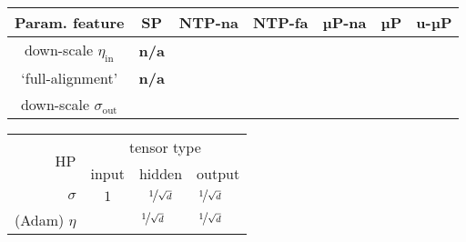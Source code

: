 \documentclass{article}
\newcommand{\tick}{\ding{51}}
\newcommand{\cross}{\ding{55}}
\begin{document}
\vspace{1em}
\noindent
\begin{minipage}[t]{0.45\textwidth}
    \centering
    \begin{tabular}{ccccccc}
        \toprule
        Param. feature & SP & NTP-na & NTP-fa & µP-na & µP & u-µP \\
        \midrule
        down-scale $\eta_{\textrm{in}}$ & \textbf{n/a} & \cellcolor{lightblue}{\cross} & \cellcolor{lightblue}{\cross} & \cellcolor{lightblue}{\cross} & \cellcolor{lightblue}{\cross} & \cellcolor{darkblue}{\textcolor{white}{\tick}} \\
        `full-alignment' & \textbf{n/a} & \cellcolor{lightgreen}{\cross} & \cellcolor{darkgreen}{\textcolor{white}{\tick}} & \cellcolor{lightgreen}{\cross} & \cellcolor{darkgreen}{\textcolor{white}{\tick}} & \cellcolor{darkgreen}{\textcolor{white}{\tick}} \\
        down-scale $\sigma_{\textrm{out}}$ & \cellcolor{lightorange}{\cross} & \cellcolor{lightorange}{\cross} & \cellcolor{lightorange}{\cross} & \cellcolor{darkorange}{\textcolor{white}{\tick}} & \cellcolor{darkorange}{\textcolor{white}{\tick}} & \cellcolor{darkorange}{\textcolor{white}{\tick}} \\
        \bottomrule
    \end{tabular}
\end{minipage}%
\hspace{6em}
\begin{minipage}[t]{0.45\textwidth}
    \centering
    \begin{tabular}{rcccccc}
        \toprule
        \multirow{2}{*}{HP\hspace{1.4em}} & \multicolumn{6}{c}{tensor type}\\ \cline{2-7}
         & \multicolumn{2}{c}{input} & \multicolumn{2}{c}{hidden} & \multicolumn{2}{c}{output}\\
        \midrule
        $\sigma$ & \multicolumn{2}{c}{$1$} & \multicolumn{2}{c}{$\nicefrac{1}{\sqrt{d}}$} & \cellcolor{lightorange}$\nicefrac{1}{\sqrt{d}}$ & \cellcolor{darkorange}{\textcolor{white}{$\;\nicefrac{1}{d}\;$}} \\
        (Adam) $\eta$ & \cellcolor{lightblue}{$\,\,\; 1 \,\,\;$} & \cellcolor{darkblue}{\textcolor{white}{$\nicefrac{1}{\sqrt{d}}$}} & \cellcolor{lightgreen}$\nicefrac{1}{\sqrt{d}}$ & \cellcolor{darkgreen}{\textcolor{white}{$\;\nicefrac{1}{d}\;$}} & \cellcolor{lightgreen}$\nicefrac{1}{\sqrt{d}}$ & \cellcolor{darkgreen}{\textcolor{white}{$\;\nicefrac{1}{d}\;$}} \\
        \bottomrule
    \end{tabular}
\end{minipage}
\vspace{0.75em}
\end{document}
